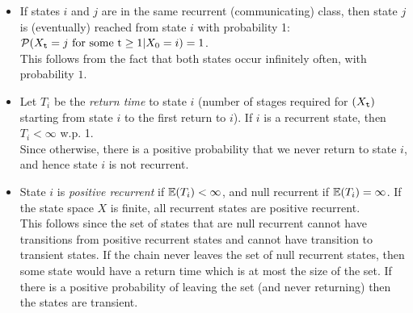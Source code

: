 \begin{itemize}
\item
If states $i$ and $j$ are in the same recurrent (communicating)
class, then state $j$ is (eventually) reached from state $i$ with
probability 1:  ${\cal P}({X_{\tt t}} = j{\textrm{ for some t}} \ge
1|{X_0} = i) = 1$.\\
This follows from the fact that both states occur infinitely often,
with probability $1$.
\item
Let ${T_i}$ be the {\em return time} to state $i$  (number of stages
required for $({X_{\tt t}})$ starting from state $i$ to the first
return to $i$). If $i$ is a recurrent
state, then ${T_i} < \infty $ w.p. 1.\\
Since otherwise, there is a positive probability that we never
return to state $i$, and hence state $i$ is not recurrent.
%
\item State $i$ is {\em positive recurrent} if  $\mathbb{E}({T_i}) < \infty $,
and null recurrent if $\mathbb{E}({T_i}) = \infty $. If the state space $X$
is finite, all recurrent states are positive recurrent.\\
This follows since the set of states that are null recurrent cannot
have transitions from positive recurrent states and cannot have
transition to transient states. If the chain never leaves the set of
null recurrent states, then some state would have a return time
which is at most the size of the set. If there is a positive
probability of leaving the set (and never returning) then the states
are transient.
\end{itemize}

